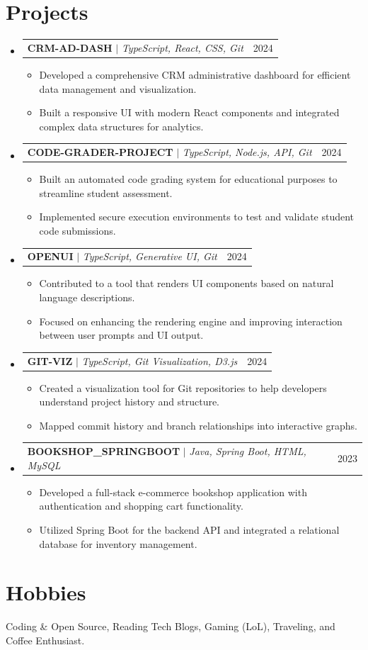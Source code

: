 \documentclass[letterpaper,11pt]{article}
\makeatletter
\newcommand{\resumeItem}[1]{
  \item\small{
    {#1 \vspace{-2pt}}
  }
}
\newcommand{\resumeProjectHeading}[2]{
    \item
    \begin{tabular*}{0.97\textwidth}{l@{\extracolsep{\fill}}r}
      \small#1 & #2 \\
    \end{tabular*}\vspace{-7pt}
}
\newcommand{\resumeSubHeadingListStart}{\begin{itemize}[leftmargin=0.15in, label={}]}
\newcommand{\resumeSubHeadingListEnd}{\end{itemize}}
\newcommand{\resumeItemListStart}{\begin{itemize}}
\newcommand{\resumeItemListEnd}{\end{itemize}\vspace{-5pt}}
\makeatother
\begin{document}
\section{Projects}
    \resumeSubHeadingListStart

        \resumeProjectHeading
        {\textbf{CRM-AD-DASH} $|$ \footnotesize\emph{TypeScript, React, CSS, Git}}{2024}
        \resumeItemListStart
            \resumeItem{Developed a comprehensive CRM administrative dashboard for efficient data management and visualization.}
            \resumeItem{Built a responsive UI with modern React components and integrated complex data structures for analytics.}
          \resumeItemListEnd
    
        \resumeProjectHeading
        {\textbf{CODE-GRADER-PROJECT} $|$ \footnotesize\emph{TypeScript, Node.js, API, Git}}{2024}
        \resumeItemListStart
            \resumeItem{Built an automated code grading system for educational purposes to streamline student assessment.}
            \resumeItem{Implemented secure execution environments to test and validate student code submissions.}
          \resumeItemListEnd

        \resumeProjectHeading
        {\textbf{OPENUI} $|$ \footnotesize\emph{TypeScript, Generative UI, Git}}{2024}
        \resumeItemListStart
            \resumeItem{Contributed to a tool that renders UI components based on natural language descriptions.}
            \resumeItem{Focused on enhancing the rendering engine and improving interaction between user prompts and UI output.}
          \resumeItemListEnd

        \resumeProjectHeading
        {\textbf{GIT-VIZ} $|$ \footnotesize\emph{TypeScript, Git Visualization, D3.js}}{2024}
        \resumeItemListStart
            \resumeItem{Created a visualization tool for Git repositories to help developers understand project history and structure.}
            \resumeItem{Mapped commit history and branch relationships into interactive graphs.}
          \resumeItemListEnd
          
      \resumeProjectHeading
        {\textbf{BOOKSHOP\_SPRINGBOOT} $|$ \footnotesize\emph{Java, Spring Boot, HTML, MySQL}}{2023}
        \resumeItemListStart
            \resumeItem{Developed a full-stack e-commerce bookshop application with authentication and shopping cart functionality.}
            \resumeItem{Utilized Spring Boot for the backend API and integrated a relational database for inventory management.}
        \resumeItemListEnd
          
    \resumeSubHeadingListEnd

\section{Hobbies}
 \begin{itemize}[leftmargin=0.15in, label={}]
    \small{\item{
     Coding & Open Source, Reading Tech Blogs, Gaming (LoL), Traveling, and Coffee Enthusiast.
    }}
 \end{itemize}
\end{document}
